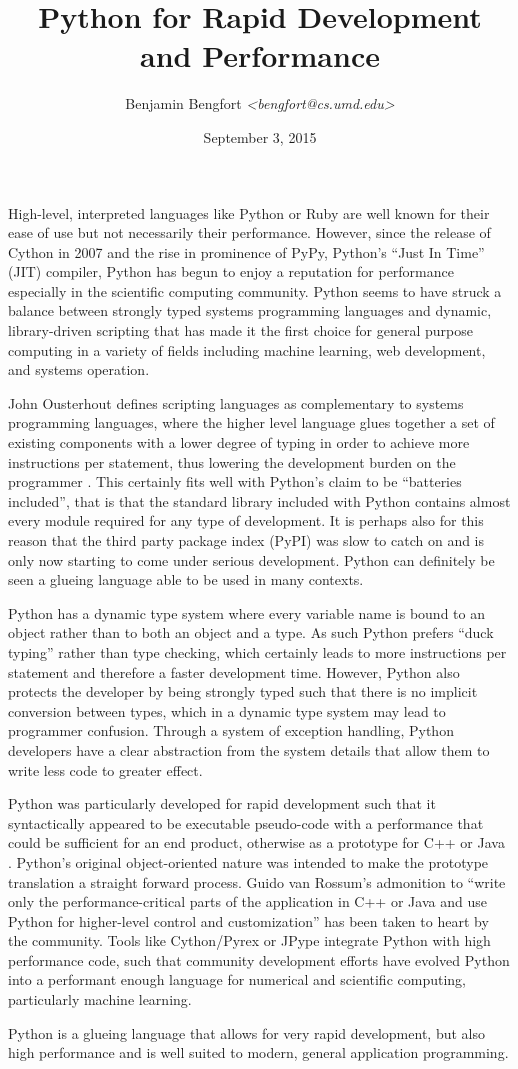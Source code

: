 \documentclass[11pt,letterpaper]{article}
\title{Python for Rapid Development and Performance}
\author{Benjamin Bengfort \textit{<bengfort@cs.umd.edu>}}
\date{September 3, 2015}
\begin{document}
\maketitle

High-level, interpreted languages like Python or Ruby are well known for their ease of use but not necessarily their performance. However, since the release of Cython in 2007 and the rise in prominence of PyPy, Python's ``Just In Time'' (JIT) compiler, Python has begun to enjoy a reputation for performance especially in the scientific computing community. Python seems to have struck a balance between strongly typed systems programming languages and dynamic, library-driven scripting that has made it the first choice for general purpose computing in a variety of fields including machine learning, web development, and systems operation.

John Ousterhout defines scripting languages as complementary to systems programming languages, where the higher level language glues together a set of existing components with a lower degree of typing in order to achieve more instructions per statement, thus lowering the development burden on the programmer \cite{ousterhout1998scripting}. This certainly fits well with Python's claim to be ``batteries included'', that is that the standard library included with Python contains almost every module required for any type of development. It is perhaps also for this reason that the third party package index (PyPI) was slow to catch on and is only now starting to come under serious development. Python can definitely be seen a glueing language able to be used in many contexts.

Python has a dynamic type system where every variable name is bound to an object rather than to both an object and a type. As such Python prefers ``duck typing'' rather than type checking, which certainly leads to more instructions per statement and therefore a faster development time. However, Python also protects the developer by being strongly typed such that there is no implicit conversion between types, which in a dynamic type system may lead to programmer confusion. Through a system of exception handling, Python developers have a clear abstraction from the system details that allow them to write less code to greater effect.

Python was particularly developed for rapid development such that it syntactically appeared to be executable pseudo-code with a performance that could be sufficient for an end product, otherwise as a prototype for C++ or Java \cite{rossum1998glue}. Python's original object-oriented nature was intended to make the prototype translation a straight forward process. Guido van Rossum's admonition to ``write only the performance-critical parts of the application in C++ or Java and use Python for higher-level control and customization'' has been taken to heart by the community. Tools like Cython/Pyrex or JPype integrate Python with high performance code, such that community development efforts have evolved Python into a performant enough language for numerical and scientific computing, particularly machine learning.

Python is a glueing language that allows for very rapid development, but also high performance and is well suited to modern, general application programming.



\end{document}
